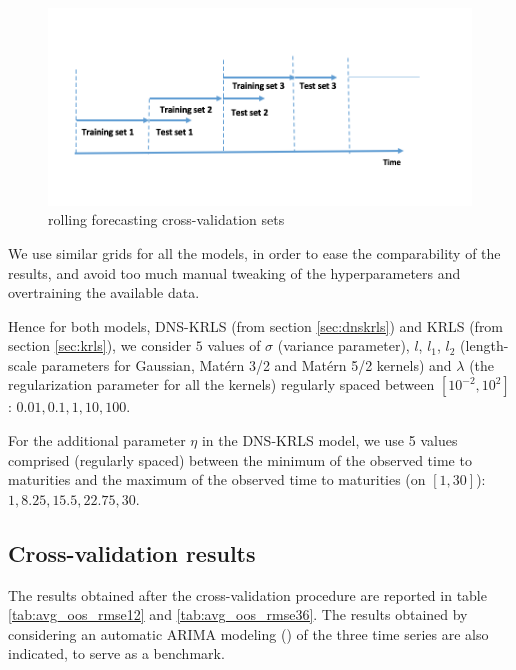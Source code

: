 \begin{figure}[!htb]
\centering
\includegraphics[width=13.5cm]{gfx/chapter-krls-models/rolling_cv}
\caption{rolling forecasting cross-validation sets}
\label{rolling_cv}
\end{figure}


We use similar grids for all the models, in order to ease the comparability of the results, and avoid too much manual tweaking of the hyperparameters and overtraining the available data. 

\medskip

Hence for both models, DNS-KRLS (from section \ref{sec:dnskrls}) and KRLS (from section \ref{sec:krls}), we consider $5$ values of $\sigma$ (variance parameter), $l$, $l_1$, $l_2$ (length-scale parameters for Gaussian, Mat\'ern 3/2 and Mat\'ern 5/2 kernels) and $\lambda$ (the regularization parameter for all the kernels) regularly spaced between $\left[ 10^{-2}, 10^2\right]$: $0.01, 0.1, 1, 10, 100$. 

\medskip

For the additional parameter $\eta$ in the DNS-KRLS model, we use 5 values comprised (regularly spaced) between the minimum of the observed time to maturities  and the maximum of the observed time to maturities (on $\left[1, 30\right]$): $1, 8.25, 15.5, 22.75, 30$.


\subsection{Cross-validation results}

The results obtained after the cross-validation procedure are reported in table \ref{tab:avg_oos_rmse12} and \ref{tab:avg_oos_rmse36}. The results obtained by considering an automatic ARIMA modeling (\cite{hyndman2008automatic}) of the three time series are also indicated, to serve as a benchmark. 

